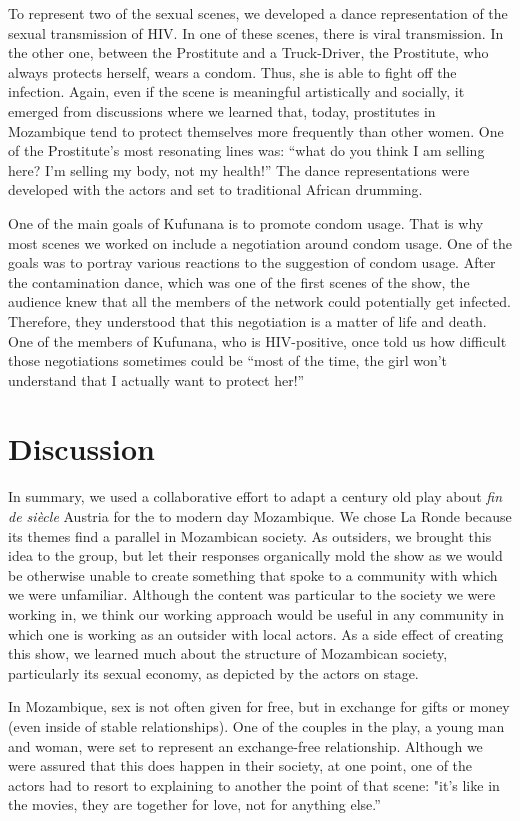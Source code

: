 \documentclass[article,twocolumn]{memoir}
\begin{document}
To represent two of the sexual scenes, we developed a dance representation of
the sexual transmission of HIV. In one of these scenes, there is viral
transmission. In the other one, between the Prostitute and a Truck-Driver, the
Prostitute, who always protects herself, wears a condom. Thus, she is able to
fight off the infection. Again, even if the scene is meaningful artistically and
socially, it emerged from discussions where we learned that, today, prostitutes
in Mozambique tend to protect themselves more frequently than other women. One
of the Prostitute's most resonating lines was: ``what do you think I am selling
here? I'm selling my body, not my health!'' The dance representations were
developed with the actors and set to traditional African drumming.

One of the main goals of Kufunana is to promote condom usage. That is why most
scenes we worked on include a negotiation around condom usage. One of the goals
was to portray various reactions to the suggestion of condom usage. After the
contamination dance, which was one of the first scenes of the show, the
audience knew that all the members of the network could potentially get
infected. Therefore, they understood that this negotiation is a matter of life
and death. One of the members of Kufunana, who is HIV-positive, once told us
how difficult those negotiations sometimes could be ``most of the time, the
girl won't understand that I actually want to protect her!''

\chapter{Discussion}

In summary, we used a collaborative effort to adapt a century old play about
\textit{fin de siècle} Austria for the to modern day Mozambique. We chose
La Ronde because its themes find a parallel in Mozambican society.  As
outsiders, we brought this idea to the group, but let their responses
organically mold the show as we would be otherwise unable to create something
that spoke to a community with which we were unfamiliar. Although the content
was particular to the society we were working in, we think our working approach
would be useful in any community in which one is working as an outsider with
local actors. As a side effect of creating this show, we learned much about the
structure of Mozambican society, particularly its sexual economy, as depicted
by the actors on stage.

In Mozambique, sex is not often given for free, but in exchange for gifts or
money (even inside of stable relationships). One of the couples in the play, a
young man and woman, were set to represent an exchange-free relationship.
Although we were assured that this does happen in their society, at one point,
one of the actors had to resort to explaining to another the point of that
scene: "it's like in the movies, they are together for love, not for anything
else.''
\end{document}
